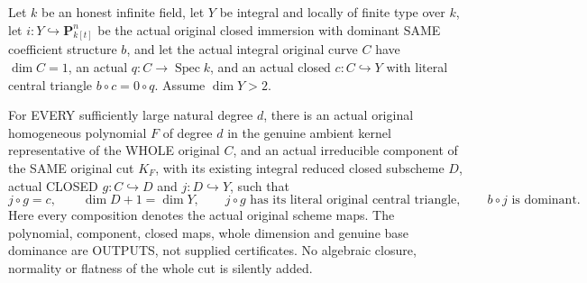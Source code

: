 \begin{theorem}
\label{thm:pl-gauss-original-horizontal-cut-component-through-curve}
\leanok
Let $k$ be an honest infinite field, let $Y$ be integral and locally
of finite type over $k$, let $i:Y\hookrightarrow\mathbf P^n_{k[t]}$
be the actual original closed immersion with dominant SAME coefficient
structure $b$, and let the actual integral original curve $C$ have
$\dim C=1$, an actual $q:C\to\operatorname{Spec}k$, and an actual
closed $c:C\hookrightarrow Y$ with literal central triangle
$b\circ c=0\circ q$. Assume $\dim Y>2$.

For EVERY sufficiently large natural degree $d$, there is an actual
original homogeneous polynomial $F$ of degree $d$ in the genuine
ambient kernel representative of the WHOLE original $C$, and an
actual irreducible component of the SAME original cut $K_F$, with
its existing integral reduced closed subscheme $D$, actual CLOSED
$g:C\hookrightarrow D$ and $j:D\hookrightarrow Y$, such that
\[
 j\circ g=c,\qquad \dim D+1=\dim Y,
 \qquad j\circ g\text{ has its literal original central triangle},
 \qquad b\circ j\text{ is dominant}.
\]
Here every composition denotes the actual original scheme maps. The
polynomial, component, closed maps, whole dimension and genuine base
dominance are OUTPUTS, not supplied certificates. No algebraic closure,
normality or flatness of the whole cut is silently added.
\end{theorem}

